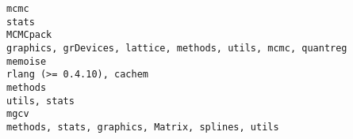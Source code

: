 \documentclass[
  letterpaper,
  DIV=11,
  numbers=noendperiod]{scrreprt}
\begin{document}
\begin{verbatim}
mcmc                                                                                                                                                                                                                                                                                                                                                                                                                                                                                                                                                                                                                 stats
MCMCpack                                                                                                                                                                                                                                                                                                                                                                                                                                                                                                                                                      graphics, grDevices, lattice, methods, utils, mcmc, quantreg
memoise                                                                                                                                                                                                                                                                                                                                                                                                                                                                                                                                                                                          rlang (>= 0.4.10), cachem
methods                                                                                                                                                                                                                                                                                                                                                                                                                                                                                                                                                                                                       utils, stats
mgcv                                                                                                                                                                                                                                                                                                                                                                                                                                                                                                                                                                      methods, stats, graphics, Matrix, splines, utils

\end{verbatim}
\end{document}
